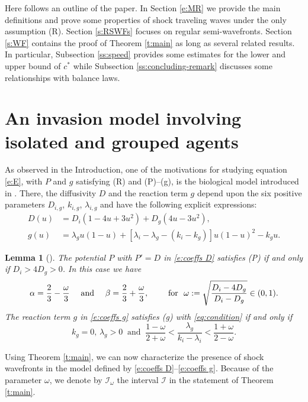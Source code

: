 \documentclass[11pt,a4paper]{article}
\newtheorem{lemma}{Lemma}[section]
\begin{document}
Here follows an outline of the paper. In Section \ref{e:MR} we provide the main definitions and prove some properties of shock traveling waves under the only assumption (R). Section \ref{s:RSWFs} focuses on regular semi-wavefronts. Section \ref{s:WF} contains the proof of Theorem \ref{t:main} as long as several related results. In particular, Subsection \ref{ss:speed} provides some estimates for the lower and upper bound of $c^*$ while Subsection \ref{ss:concluding-remark} discusses some relationships with balance laws.
\section{An invasion model involving isolated and grouped agents}\label{s:modello}
\setcounter{equation}{0}
As observed in the Introduction, one of the motivations for studying equation \eqref{e:E}, with $P$ and $g$ satisfying (R) and (P)--(g), is the biological model introduced in \cite{JBMS}. There, the diffusivity $D$ and the reaction term $g$ depend upon the six positive parameters $D_{i,g}$, $k_{i,g}$, $\lambda_{i,g}$ and have the following explicit expressions:
\begin{align}
\label{e:coeffs D}
D(u) &= D_i\left(1-4u+3u^2\right) + D_g\left(4u-3u^2\right),
\\
\label{e:coeffs g}
g(u) &= \lambda_g u (1-u) +\left[\lambda_i-\lambda_g- \left(k_i - k_g\right) \right] u(1-u)^2 -k_g u.
\end{align}

\begin{lemma}[\cite{BCM5}]\label{l:la}
The potential $P$ with $P'=D$ in \eqref{e:coeffs D} satisfies {\rm (P)} if and only if $D_i>4D_g>0$. In this case we have
\begin{equation}\label{e:alphabeta}
\alpha=\frac23 - \frac\omega3 \quad \hbox{ and }\quad \beta=\frac23 + \frac\omega3, \qquad  \hbox{ for }\  \omega :=\sqrt{\frac{D_i-4D_g}{D_i-D_g}}\in (0,1).
\end{equation}
%
The reaction term $g$ in \eqref{e:coeffs g} satisfies {\rm (g)} with \eqref{eq:condition} if and only if 
\begin{equation}\label{e:acb}
k_g=0, \, \lambda_g>0 \ \mbox{ and } \ \frac{1-\omega}{2+\omega} < \frac{\lambda_g}{k_i-\lambda_i}<\frac{1+\omega}{2-\omega}.
\end{equation}
\end{lemma}


Using Theorem \ref{t:main}, we can now characterize the presence of shock wavefronts in the model defined by \eqref{e:coeffs D}–\eqref{e:coeffs g}. Because of the parameter $\omega$, we denote by $\mathcal{I}_\omega$ the interval $\mathcal{I}$ in the statement of Theorem \ref{t:main}.
\end{document}
